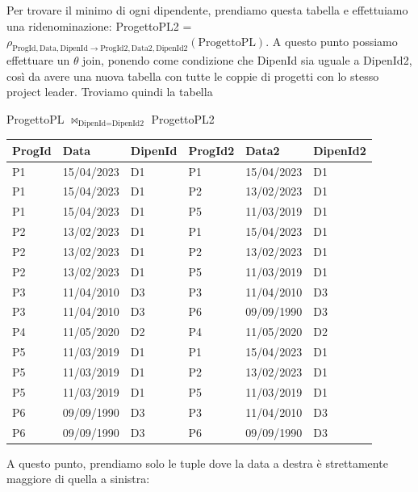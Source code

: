 \documentclass[11pt, a4paper, titlepage, oneside]{scrbook}
\begin{document}
Per trovare il minimo di ogni dipendente, prendiamo questa tabella e effettuiamo una ridenominazione: ProgettoPL2 = $\rho_{\text{ProgId}, \text{Data}, \text{DipenId} \rightarrow \text{ProgId2}, \text{Data2}, \text{DipenId2}}(\text{ProgettoPL})$. A questo punto possiamo effettuare un $\theta$ join, ponendo come condizione che DipenId sia uguale a DipenId2, così da avere una nuova tabella con tutte le coppie di progetti con lo stesso project leader. Troviamo quindi la tabella

\begin{center}
ProgettoPL $\bowtie_{\text{DipenId} = \text{DipenId2}}$ ProgettoPL2 \nopagebreak
    
\begin{tabular}{|l|l|l|l|l|l|}
\hline
\textbf{ProgId} & \textbf{Data} & \textbf{DipenId} & \textbf{ProgId2} & \textbf{Data2} & \textbf{DipenId2}\\ \hline
P1 & 15/04/2023 & D1 & P1 & 15/04/2023 & D1 \\
P1 & 15/04/2023 & D1 & P2 & 13/02/2023 & D1 \\
P1 & 15/04/2023 & D1 & P5 & 11/03/2019 & D1 \\
P2 & 13/02/2023 & D1 & P1 & 15/04/2023 & D1 \\
P2 & 13/02/2023 & D1 & P2 & 13/02/2023 & D1 \\
P2 & 13/02/2023 & D1 & P5 & 11/03/2019 & D1 \\
P3 & 11/04/2010 & D3 & P3 & 11/04/2010 & D3 \\
P3 & 11/04/2010 & D3 & P6 & 09/09/1990 & D3 \\
P4 & 11/05/2020 & D2 & P4 & 11/05/2020 & D2 \\
P5 & 11/03/2019 & D1 & P1 & 15/04/2023 & D1 \\
P5 & 11/03/2019 & D1 & P2 & 13/02/2023 & D1 \\
P5 & 11/03/2019 & D1 & P5 & 11/03/2019 & D1\\
P6 & 09/09/1990 & D3 & P3 & 11/04/2010 & D3 \\
P6 & 09/09/1990 & D3 & P6 & 09/09/1990 & D3 \\\hline
\end{tabular}
\end{center}

A questo punto, prendiamo solo le tuple dove la data a destra è strettamente maggiore di quella a sinistra:
\end{document}
